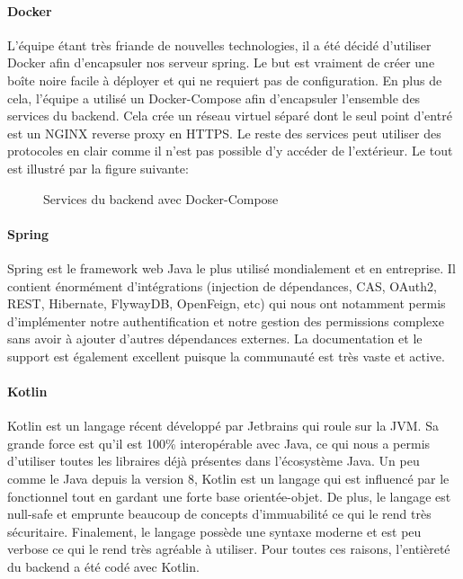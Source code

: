         \paragraph{Docker}
        L'équipe étant très friande de nouvelles technologies, il a été décidé d'utiliser Docker afin d'encapsuler nos serveur spring. Le but est vraiment de créer une boîte noire facile à déployer et qui ne requiert pas de configuration. En plus de cela, l'équipe a utilisé un Docker-Compose afin d'encapsuler l'ensemble des services du backend. Cela crée un réseau virtuel séparé dont le seul point d'entré est un NGINX reverse proxy en HTTPS. Le reste des services peut utiliser des protocoles en clair comme il n'est pas possible d'y accéder de l'extérieur. Le tout est illustré par la figure suivante:

        \begin{figure}[hp] \centering
            
            \caption{Services du backend avec Docker-Compose}
            \label{fig.docker}
        \end{figure}

        \paragraph{Spring}
        Spring est le framework web Java le plus utilisé mondialement et en entreprise. Il contient énormément d'intégrations (injection de dépendances, CAS, OAuth2, REST, Hibernate, FlywayDB, OpenFeign, etc) qui nous ont notamment permis d'implémenter notre authentification et notre gestion des permissions complexe sans avoir à ajouter d'autres dépendances externes. La documentation et le support est également excellent puisque la communauté est très vaste et active.
        
        \paragraph{Kotlin}
        Kotlin est un langage récent développé par Jetbrains qui roule sur la JVM. Sa grande force est qu'il est 100\% interopérable avec Java, ce qui nous a permis d'utiliser toutes les libraires déjà présentes dans l'écosystème Java. Un peu comme le Java depuis la version 8, Kotlin est un langage qui est influencé par le fonctionnel tout en gardant une forte base orientée-objet. De plus, le langage est null-safe et emprunte beaucoup de concepts d'immuabilité ce qui le rend très sécuritaire. Finalement, le langage possède une syntaxe moderne et est peu verbose ce qui le rend très agréable à utiliser. Pour toutes ces raisons, l'entièreté du backend a été codé avec Kotlin.

